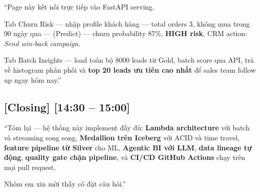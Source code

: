 \documentclass[12pt, a4paper]{article}
\newenvironment{speakerbox}[2]{%
  \begin{tcolorbox}[
    enhanced, breakable,
    colback=#1!6!white,
    colframe=#1,
    colbacktitle=#1,
    coltitle=white,
    fonttitle=\bfseries\large,
    title={#2},
    arc=4pt,
    boxrule=1.5pt,
    left=8pt, right=8pt, top=6pt, bottom=6pt,
  ]
}{%
  \end{tcolorbox}
}
\newcommand{\timing}[1]{%
  \hfill{\small\bfseries\color{gray}[#1]}%
}
\begin{document}
\begin{speakerbox}{p4color}{\faUser\ Người 4 · 9:00 -- 15:00}
\begin{scriptbox}
``Page này kết nối trực tiếp vào FastAPI serving.

Tab Churn Risk --- nhập profile khách hàng --- total orders 3, không mua
trong 90 ngày qua --- (Predict) --- churn probability 87\%, \textbf{HIGH risk},
CRM action: \textit{Send win-back campaign}.

Tab Batch Insights --- load toàn bộ 8000 leads từ Gold, batch score qua API,
trả về histogram phân phối và \textbf{top 20 leads ưu tiên cao nhất}
để sales team follow up ngay hôm nay.''
\end{scriptbox}

\subsection*{[Closing] \timing{14:30 -- 15:00}}

\begin{scriptbox}
``Tóm lại --- hệ thống này implement đầy đủ: \textbf{Lambda architecture} với batch
và streaming song song, \textbf{Medallion trên Iceberg} với ACID và time travel,
\textbf{feature pipeline từ Silver} cho ML, \textbf{Agentic BI với LLM},
\textbf{data lineage tự động}, \textbf{quality gate chặn pipeline},
và \textbf{CI/CD GitHub Actions} chạy trên mọi pull request.

Nhóm em xin mời thầy cô đặt câu hỏi.''
\end{scriptbox}

\end{speakerbox}

\vspace{1em}
\end{document}
